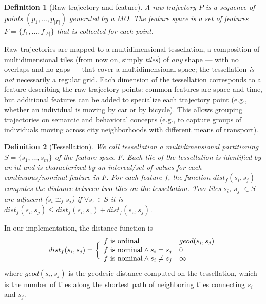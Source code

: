 \documentclass[
]{ceurart}
\newtheorem{definition}{Definition}
\begin{document}
\begin{definition}[Raw trajectory and feature] 
A \textit{raw trajectory} $P$ is a sequence of points $(p_1, \ldots, p_{|P|})$ generated by a MO. 
The \textit{feature space} is a set of features $F=\{f_1,\ldots,f_{|F|}\}$ that is collected for each point.
\end{definition}

Raw trajectories are mapped to a multidimensional tessellation, a composition of multidimensional tiles (from now on, simply \textit{tiles}) of \textit{any} shape --- with no overlaps and no gaps --- that cover a multidimensional space; the tessellation \textit{is not} necessarily a regular grid.
Each dimension of the tessellation corresponds to a feature describing the raw trajectory points: common features are space and time, but additional features can be added to specialize each trajectory point (e.g., whether an individual is moving by car or by bicycle).
This allows grouping trajectories on semantic and behavioral concepts (e.g., to capture groups of individuals moving across city neighborhoods with different means of transport).

\begin{definition}[Tessellation] 
We call \textit{tessellation} a multidimensional partitioning $S = \{s_1, \ldots, s_m\}$ of the feature space $F$.
Each \textit{tile} of the tessellation is identified by an $id$ and is characterized by an interval/set of values for each continuous/nominal feature in $F$.
For each feature $f$, the function $dist_f(s_i, s_j)$ computes the distance between two tiles on the tessellation.
Two tiles $s_i$, $s_j$ $\in S$ are  \textit{adjacent} ($s_i \cong_{f} s_j$) if $\forall s_z \in S$ it is $dist_f(s_i,s_j)\leq dist_f(s_i,s_z) + dist_f(s_z,s_j)$.
\end{definition}

In our implementation, the distance function is
\begin{equation}
dist_f(s_i,s_j) =
\bigg \{
\begin{array}{ll}
f \textup{ is ordinal}  & geod(s_i,s_j) \\
f \textup{ is nominal} \wedge s_i = s_j & 0 \\
f \textup{ is nominal} \wedge s_i \neq s_j & \infty \\
\end{array}
\end{equation}
%
where $geod(s_i,s_j)$ is the geodesic distance \citep{bouttier2003geodesic} computed on the tessellation, which is the number of tiles along the shortest path of neighboring tiles connecting $s_i$ and $s_j$.
\end{document}
